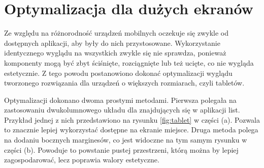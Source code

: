 \section{Optymalizacja dla dużych ekranów}

Ze względu na różnorodność urządzeń mobilnych oczekuje się zwykle od dostępnych aplikacji, aby były do nich przystosowane. Wykorzystanie identycznego wyglądu na wszystkich zwykle się nie sprawdza, ponieważ komponenty mogą być zbyt ściśnięte, rozciągnięte lub też ucięte, co nie wygląda estetycznie. Z tego powodu postanowiono dokonać optymalizacji wyglądu tworzonego rozwiązania dla urządzeń o większych rozmiarach, czyli tabletów. 

Optymalizacji dokonano dwoma prostymi metodami. Pierwsza polegała na zastosowaniu dwukolumnowego układu dla znajdujących się w aplikacji list. Przykład jednej z nich przedstawiono na rysunku \ref{fig:tablet} w części (a). Pozwala to znacznie lepiej wykorzystać dostępne na ekranie miejsce. Druga metoda polega na dodaniu bocznych marginesów, co jest widoczne na tym samym rysunku w części (b). Powoduje to powstanie pustej przestrzeni, którą można by lepiej zagospodarować, lecz poprawia walory estetyczne. 

